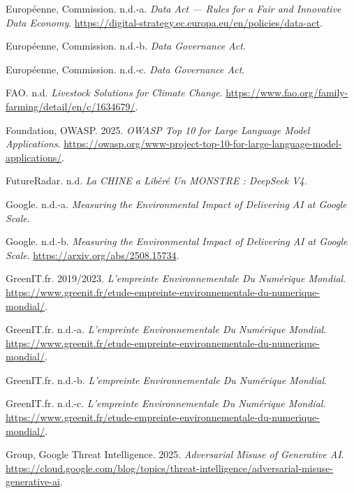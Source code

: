 \documentclass[
  10pt,
  a4paper,
  DIV=11,
  numbers=noendperiod,
  oneside]{scrreprt}
\newlength{\cslhangindent}
\newenvironment{CSLReferences}[2] %
 {\begin{list}{}{%
  \setlength{\itemindent}{0pt}
  \setlength{\leftmargin}{0pt}
  \setlength{\parsep}{0pt}
  \ifodd #1
   \setlength{\leftmargin}{\cslhangindent}
   \setlength{\itemindent}{-1\cslhangindent}
  \fi
  \setlength{\itemsep}{#2\baselineskip}}}
 {\end{list}}
\let\oldemph\emph
\renewcommand{\emph}[1]{\oldemph{\textcolor{cmmgray}{#1}}}
\begin{document}
\begin{CSLReferences}{1}{1}
Européenne, Commission. n.d.-a. \emph{Data Act --- Rules for a Fair and
Innovative Data Economy}.
\url{https://digital-strategy.ec.europa.eu/en/policies/data-act}.

Européenne, Commission. n.d.-b. \emph{Data Governance Act}.

Européenne, Commission. n.d.-c. \emph{Data Governance Act}.

FAO. n.d. \emph{Livestock Solutions for Climate Change}.
\url{https://www.fao.org/family-farming/detail/en/c/1634679/}.

Foundation, OWASP. 2025. \emph{OWASP Top 10 for Large Language Model
Applications}.
\url{https://owasp.org/www-project-top-10-for-large-language-model-applications/}.

FutureRadar. n.d. \emph{La CHINE a Libéré Un MONSTRE : DeepSeek V4}.

Google. n.d.-a. \emph{Measuring the Environmental Impact of Delivering
AI at Google Scale}.

Google. n.d.-b. \emph{Measuring the Environmental Impact of Delivering
AI at Google Scale}. \url{https://arxiv.org/abs/2508.15734}.

GreenIT.fr. 2019/2023. \emph{L'empreinte Environnementale Du Numérique
Mondial}.
\url{https://www.greenit.fr/etude-empreinte-environnementale-du-numerique-mondial/}.

GreenIT.fr. n.d.-a. \emph{L'empreinte Environnementale Du Numérique
Mondial}.
\url{https://www.greenit.fr/etude-empreinte-environnementale-du-numerique-mondial/}.

GreenIT.fr. n.d.-b. \emph{L'empreinte Environnementale Du Numérique
Mondial}.

GreenIT.fr. n.d.-c. \emph{L'empreinte Environnementale Du Numérique
Mondial}.
\url{https://www.greenit.fr/etude-empreinte-environnementale-du-numerique-mondial/}.

Group, Google Threat Intelligence. 2025. \emph{Adversarial Misuse of
Generative AI}.
\url{https://cloud.google.com/blog/topics/threat-intelligence/adversarial-misuse-generative-ai}.


\end{CSLReferences}
\end{document}
